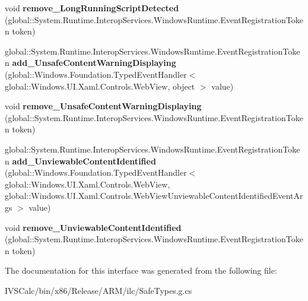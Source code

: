 \begin{DoxyCompactItemize}
\item 
\mbox{\label{interface_windows_1_1_u_i_1_1_xaml_1_1_controls_1_1_i_web_view2_af037b1883abb030235ed2cf192337825}} 
void {\bfseries remove\+\_\+\+Long\+Running\+Script\+Detected} (global\+::\+System.\+Runtime.\+Interop\+Services.\+Windows\+Runtime.\+Event\+Registration\+Token token)
\item 
\mbox{\label{interface_windows_1_1_u_i_1_1_xaml_1_1_controls_1_1_i_web_view2_acdcabb7c71e53867b288d8758f233b6e}} 
global\+::\+System.\+Runtime.\+Interop\+Services.\+Windows\+Runtime.\+Event\+Registration\+Token {\bfseries add\+\_\+\+Unsafe\+Content\+Warning\+Displaying} (global\+::\+Windows.\+Foundation.\+Typed\+Event\+Handler$<$ global\+::\+Windows.\+U\+I.\+Xaml.\+Controls.\+Web\+View, object $>$ value)
\item 
\mbox{\label{interface_windows_1_1_u_i_1_1_xaml_1_1_controls_1_1_i_web_view2_a3eb3a06e24cf2bd12de883bf81fb40d7}} 
void {\bfseries remove\+\_\+\+Unsafe\+Content\+Warning\+Displaying} (global\+::\+System.\+Runtime.\+Interop\+Services.\+Windows\+Runtime.\+Event\+Registration\+Token token)
\item 
\mbox{\label{interface_windows_1_1_u_i_1_1_xaml_1_1_controls_1_1_i_web_view2_a638c2029f3df84d7780aad5ec3492315}} 
global\+::\+System.\+Runtime.\+Interop\+Services.\+Windows\+Runtime.\+Event\+Registration\+Token {\bfseries add\+\_\+\+Unviewable\+Content\+Identified} (global\+::\+Windows.\+Foundation.\+Typed\+Event\+Handler$<$ global\+::\+Windows.\+U\+I.\+Xaml.\+Controls.\+Web\+View, global\+::\+Windows.\+U\+I.\+Xaml.\+Controls.\+Web\+View\+Unviewable\+Content\+Identified\+Event\+Args $>$ value)
\item 
\mbox{\label{interface_windows_1_1_u_i_1_1_xaml_1_1_controls_1_1_i_web_view2_a2882acdd93078aca17a084dda51aa7a7}} 
void {\bfseries remove\+\_\+\+Unviewable\+Content\+Identified} (global\+::\+System.\+Runtime.\+Interop\+Services.\+Windows\+Runtime.\+Event\+Registration\+Token token)
\end{DoxyCompactItemize}


The documentation for this interface was generated from the following file\+:\begin{DoxyCompactItemize}
\item 
I\+V\+S\+Calc/bin/x86/\+Release/\+A\+R\+M/ilc/Safe\+Types.\+g.\+cs\end{DoxyCompactItemize}
